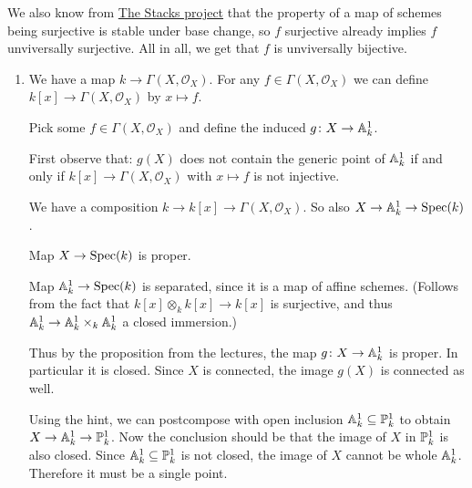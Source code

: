 \begin{exercise}{2}
\begin{enumerate}
{            We also know from \href{https://stacks.math.columbia.edu/tag/01S1}{The
            Stacks project} that the property of a map of schemes being
            surjective is stable under base change, so $f$ surjective already
            implies $f$ unviversally surjective. All in all, we get that $f$ is
            unviversally bijective.
            }
    \end{enumerate}
\end{exercise}


\begin{exercise}{3}
    \begin{enumerate}
        \item{
                We have a map $k \rightarrow \Gamma(X, \mathcal{O}_X)$.
                For any $f \in \Gamma(X, \mathcal{O}_X)$ we can define $k[x]
                \rightarrow \Gamma(X, \mathcal{O}_X)$ by $x \mapsto f$.

                Pick some $f \in \Gamma(X, \mathcal{O}_X)$ and define the
                induced $g \colon X \to \mathbb{A}^1_k$.

                First observe that:
                $g(X)$ does not contain the generic point of $\mathbb{A}^1_k$ if and
                only if $k[x] \to \Gamma(X, \mathcal{O}_X)$ with $x \mapsto f$ is not injective.

                We have a composition $k \to k[x] \to \Gamma(X, \mathcal{O}_X)$.
                So also $X \to \mathbb{A}^1_k \to \operatorname{Spec}(k)$.

                Map $X \to \operatorname{Spec}(k)$ is proper.

                Map $\mathbb{A}^1_k \to \operatorname{Spec}(k)$ is separated, since it is a map of
                affine schemes. (Follows from the fact that $k[x] \otimes_k k[x]
                \to k[x]$ is surjective, and thus $\mathbb{A}^1_k \to \mathbb{A}^1_k
                \times_k \mathbb{A}^1_k$ a closed immersion.)

                Thus by the proposition from the lectures, the map $g \colon X \to
                \mathbb{A}^1_k$ is proper. In particular it is closed. Since $X$ is
                connected, the image $g(X)$ is connected as well.

                Using the hint, we can postcompose with open inclusion $\mathbb{A}^1_k
                \subseteq \mathbb{P}^1_k$ to obtain $X \to \mathbb{A}^1_k \to \mathbb{P}^1_k$.
                Now the conclusion should be that the image of $X$ in
                $\mathbb{P}^1_k$ is also closed. Since $\mathbb{A}^1_k \subseteq \mathbb{P}^1_k$
                is not closed, the image of $X$ cannot be whole $\mathbb{A}^1_k$.
                Therefore it must be a single point.

}
\end{enumerate}
\end{exercise}
